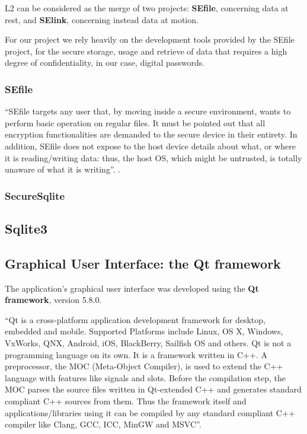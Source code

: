 L2 can be considered as the merge of two projects: \textbf{SEfile}, concerning data at rest, and \textbf{SElink}, concerning instead data at motion.

For our project we rely heavily on the development tools provided by the SEfile project, for the secure storage, usage and retrieve of data that requires a high degree of confidentiality, in our case, digital passwords.

\subsubsection{SEfile}

``SEfile targets any user that, by moving inside a secure environment, wants to perform basic operation on regular files. It must be pointed out that all encryption functionalities are demanded to the secure device in their entirety. In addition, SEfile does not expose to the host device details about what, or where it is reading/writing data: thus, the host OS, which might be untrusted, is totally unaware of what it is writing''. \cite{L2UserMan}.

\subsubsection{SecureSqlite}

\subsection{Sqlite3}

\subsection{Graphical User Interface: the Qt framework}
The application's graphical user interface was developed using the \textbf{Qt framework}, version 5.8.0. 

``Qt is a cross-platform application development framework for desktop, embedded and mobile. Supported Platforms include Linux, OS X, Windows, VxWorks, QNX, Android, iOS, BlackBerry, Sailfish OS and others. Qt is not a programming language on its own. It is a framework written in C++. A preprocessor, the MOC (Meta-Object Compiler), is used to extend the C++ language with features like signals and slots. Before the compilation step, the MOC parses the source files written in Qt-extended C++ and generates standard compliant C++ sources from them. Thus the framework itself and applications/libraries using it can be compiled by any standard compliant C++ compiler like Clang, GCC, ICC, MinGW and MSVC''.\cite{Qt}  


